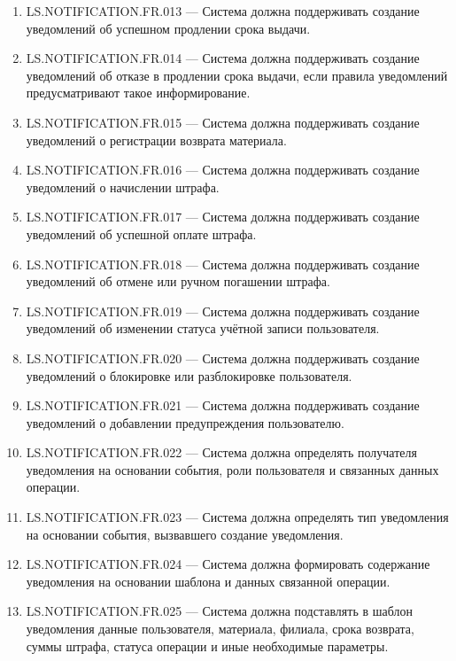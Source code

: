 \documentclass[12pt,a4paper]{article}
\begin{document}
\begin{enumerate}
		\item LS.NOTIFICATION.FR.013 --- Система должна поддерживать создание уведомлений
		об успешном продлении срока выдачи.
		
		\item LS.NOTIFICATION.FR.014 --- Система должна поддерживать создание уведомлений
		об отказе в продлении срока выдачи, если правила уведомлений предусматривают
		такое информирование.
		
		\item LS.NOTIFICATION.FR.015 --- Система должна поддерживать создание уведомлений
		о регистрации возврата материала.
		
		\item LS.NOTIFICATION.FR.016 --- Система должна поддерживать создание уведомлений
		о начислении штрафа.
		
		\item LS.NOTIFICATION.FR.017 --- Система должна поддерживать создание уведомлений
		об успешной оплате штрафа.
		
		\item LS.NOTIFICATION.FR.018 --- Система должна поддерживать создание уведомлений
		об отмене или ручном погашении штрафа.
		
		\item LS.NOTIFICATION.FR.019 --- Система должна поддерживать создание уведомлений
		об изменении статуса учётной записи пользователя.
		
		\item LS.NOTIFICATION.FR.020 --- Система должна поддерживать создание уведомлений
		о блокировке или разблокировке пользователя.
		
		\item LS.NOTIFICATION.FR.021 --- Система должна поддерживать создание уведомлений
		о добавлении предупреждения пользователю.
		
		\item LS.NOTIFICATION.FR.022 --- Система должна определять получателя уведомления
		на основании события, роли пользователя и связанных данных операции.
		
		\item LS.NOTIFICATION.FR.023 --- Система должна определять тип уведомления
		на основании события, вызвавшего создание уведомления.
		
		\item LS.NOTIFICATION.FR.024 --- Система должна формировать содержание уведомления
		на основании шаблона и данных связанной операции.
		
		\item LS.NOTIFICATION.FR.025 --- Система должна подставлять в шаблон уведомления
		данные пользователя, материала, филиала, срока возврата, суммы штрафа, статуса
		операции и иные необходимые параметры.
		

\end{enumerate}
\end{document}
